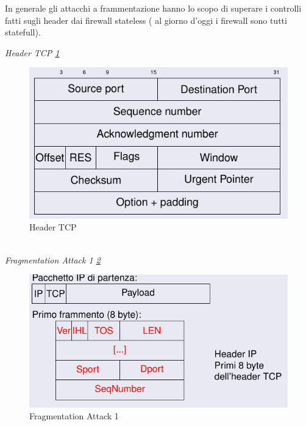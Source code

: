 \documentclass[12pt]{article}
\begin{document}
				In generale gli attacchi a frammentazione hanno lo scopo di superare i controlli fatti sugli header dai firewall stateless ( al giorno d'oggi i firewall sono tutti statefull).
				
				\textit{Header TCP \ref{fig:26}}\\
				\begin{figure}[h!]
					\centering
					\includegraphics[scale=0.60]{img/tcphead.PNG}
					\caption{Header TCP \label{fig:26}}
				\end{figure}\\
			
				\textit{Fragmentation Attack 1 \ref{fig:27}}\\
				\begin{figure}[h!]
					\centering
					\includegraphics[scale=0.60]{img/frag.PNG}
					\caption{Fragmentation Attack 1 \label{fig:27}}
				\end{figure}\\
			
\end{document}
